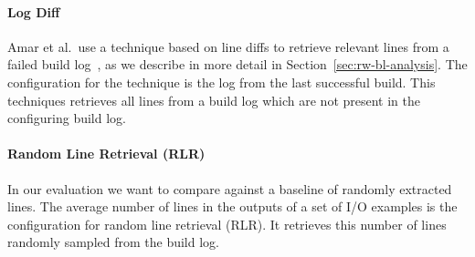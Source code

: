 \documentclass[\myrootdir/main.tex]{subfiles}
\begin{document}
\paragraph{Log Diff}
Amar et al.\ use a technique based on line diffs to retrieve relevant lines from a failed build log~\cite{amar2019mining}, as we describe in more detail in Section~\ref{sec:rw-bl-analysis}.
The configuration for the technique is the log from the last successful build.
This techniques retrieves all lines from a build log which are not present in the configuring build log.
\paragraph{Random Line Retrieval (RLR)}
In our evaluation we want to compare against a baseline of randomly extracted lines.
The average number of lines in the outputs of a set of I/O examples is the configuration for random line retrieval (RLR).
It retrieves this number of lines randomly sampled from the build log.
\end{document}
